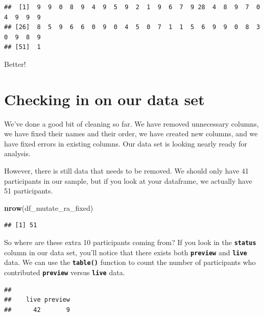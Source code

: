 \documentclass[
]{book}
\newenvironment{Shaded}{\begin{snugshade}}{\end{snugshade}}
\newcommand{\FunctionTok}[1]{\textcolor[rgb]{0.13,0.29,0.53}{\textbf{#1}}}
\newcommand{\NormalTok}[1]{#1}
\newcommand{\SpecialCharTok}[1]{\textcolor[rgb]{0.81,0.36,0.00}{\textbf{#1}}}
\begin{document}
\begin{verbatim}
##  [1]  9  9  0  8  9  4  9  5  9  2  1  9  6  7  9 28  4  8  9  7  0  4  9  9  9
## [26]  8  5  9  6  6  0  9  0  4  5  0  7  1  1  5  6  9  9  0  8  3  0  9  8  9
## [51]  1
\end{verbatim}

Better!

\section{Checking in on our data set}\label{checking-in-on-our-data-set}

We've done a good bit of cleaning so far. We have removed unnecessary columns, we have fixed their names and their order, we have created new columns, and we have fixed errors in existing columns. Our data set is looking nearly ready for analysis.

However, there is still data that needs to be removed. We should only have 41 participants in our sample, but if you look at your dataframe, we actually have 51 participants.

\begin{Shaded}
\begin{Highlighting}[]
\FunctionTok{nrow}\NormalTok{(df\_mutate\_ra\_fixed)}
\end{Highlighting}
\end{Shaded}

\begin{verbatim}
## [1] 51
\end{verbatim}

So where are these extra 10 participants coming from? If you look in the \textbf{\texttt{status}} column in our data set, you'll notice that there exists both \textbf{\texttt{preview}} and \textbf{\texttt{live}} data. We can use the \textbf{\texttt{table()}} function to count the number of participants who contributed \textbf{\texttt{preview}} versus \textbf{\texttt{live}} data.

\begin{Shaded}
\end{Shaded}

\begin{verbatim}
## 
##    live preview 
##      42       9
\end{verbatim}
\end{document}
